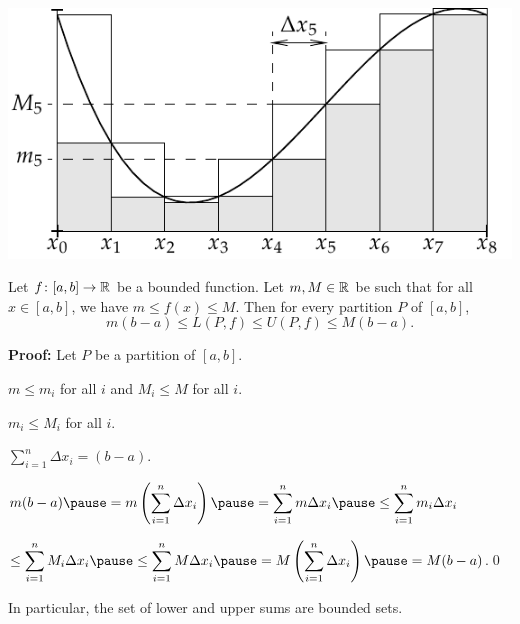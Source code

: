 \documentclass[10pt,aspectratio=169]{beamer}
\begin{document}
\begin{frame}

\begin{center}
\includegraphics{../figures/darbouxfig}
\end{center}

\end{frame}

\begin{frame}

\begin{proposition}
Let $f \colon [a,b] \to {\mathbb{R}}$ be a bounded function.  Let $m, M \in {\mathbb{R}}$ be 
such that for all $x \in [a,b]$, we have $m \leq f(x) \leq M$.
\pause
Then for every partition $P$
of $[a,b]$,
\[
m(b-a) \leq
L(P,f) \leq U(P,f)
\leq M(b-a) .
\]
\end{proposition}

\pause
\textbf{Proof:}
Let $P$ be a partition of $[a,b]$.

\pause
$m \leq m_i$ for all $i$ and $M_i \leq M$ for all $i$.

\pause
$m_i \leq M_i$ for all $i$.

\pause
$\sum_{i=1}^n \Delta x_i = (b-a)$.

\pause
\medskip

\thus
\quad
$\displaystyle
m(b-a)
\pause
=
m \left( \sum_{i=1}^n \Delta x_i \right)
\pause
=
\sum_{i=1}^n m \Delta x_i
\pause
\leq
\sum_{i=1}^n m_i \Delta x_i 
$

\pause
\medskip

\hfill\hfill\hfill\hfill\hfill\hfill\hfill\hfill
\hfill\hfill\hfill\hfill\hfill\hfill\hfill\hfill
$\displaystyle
\leq
\sum_{i=1}^n M_i \Delta x_i
\pause
\leq
\sum_{i=1}^n M \Delta x_i 
\pause
=
M \left( \sum_{i=1}^n \Delta x_i \right)
\pause
=
M(b-a)
$.\qed

\pause
\medskip

In particular, the set of lower and
upper sums are bounded sets.
\end{frame}
\end{document}
